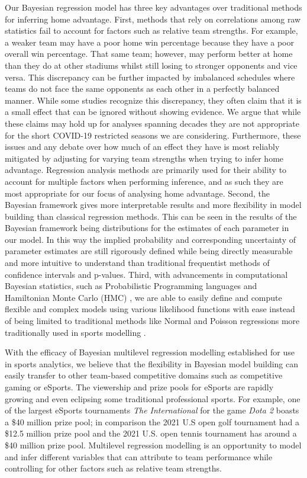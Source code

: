 Our Bayesian regression model has three key advantages over traditional methods for inferring home advantage. First, methods that rely on correlations among raw statistics fail to account for factors such as relative team strengths. For example, a weaker team may have a poor home win percentage because they have a poor overall win percentage. That same team; however, may perform better at home than they do at other stadiums whilst still losing to stronger opponents and vice versa. This discrepancy can be further impacted by imbalanced schedules where teams do not face the same opponents as each other in a perfectly balanced manner. While some studies recognize this discrepancy, they often claim that it is a small effect that can be ignored \cite{Pollard2005a} without showing evidence. We argue that while these claims may hold up for analyses spanning decades they are not appropriate for the short COVID-19 restricted seasons we are considering. Furthermore, these issues and any debate over how much of an effect they have is most reliably mitigated by adjusting for varying team strengths when trying to infer home advantage. Regression analysis methods are primarily used for their ability to account for multiple factors when performing inference, and as such they are most appropriate for our focus of analysing home advantage. Second, the Bayesian framework gives more interpretable results and more flexibility in model building than classical regression methods. This can be seen in the results of the Bayesian framework being distributions for the estimates of each parameter in our model. In this way the implied probability and corresponding uncertainty of parameter estimates are still rigorously defined while being directly measurable and more intuitive to understand than traditional frequentist methods of confidence intervals and p-values. Third, with advancements in computational Bayesian statistics, such as Probabilistic Programming languages \cite{pymc3} and Hamiltonian Monte Carlo (HMC) \cite{Betancourt2017}, we are able to easily define and compute flexible and complex models using various likelihood functions with ease instead of being limited to traditional methods like Normal and Poisson regressions more traditionally used in sports modelling \cite{Lopez2018} \cite{Glickman1998} \cite{Karlis2003} \cite{Baio2010} \cite{Benz2020}.

With the efficacy of Bayesian multilevel regression modelling established for use in sports analytics, we believe that the flexibility in Bayesian model building can easily transfer to other team-based competitive domains such as competitive gaming or eSports. The viewership and prize pools for eSports are rapidly growing and even eclipsing some traditional professional sports. For example, one of the largest eSports tournaments \textit{The International} for the game \textit{Dota 2} boasts a \$40 million prize pool; in comparison the 2021 U.S open golf tournament had a \$12.5 million prize pool and the 2021 U.S. open tennis tournament has around a \$40 million prize pool. Multilevel regression modelling is an opportunity to model and infer different variables that can attribute to team performance while controlling for other factors such as relative team strengths.

